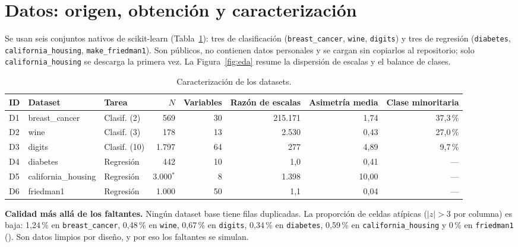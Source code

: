 \section{Datos: origen, obtención y caracterización}
\label{sec:datos}

Se usan seis conjuntos nativos de scikit-learn (Tabla~\ref{tab:datasets}): tres de clasificación (\texttt{breast\_cancer}, \texttt{wine}, \texttt{digits}) y tres de regresión (\texttt{diabetes}, \texttt{california\_housing}, \texttt{make\_friedman1}). Son públicos, no contienen datos personales y se cargan sin copiarlos al repositorio; solo \texttt{california\_housing} se descarga la primera vez. La Figura~\ref{fig:eda} resume la dispersión de escalas y el balance de clases.

\begin{table}[!htbp]
\centering
\caption{Caracterización de los datasets.}
\label{tab:datasets}
\begingroup\footnotesize\singlespacing
\begin{tabular}{@{}l l l r r r r r@{}}
\toprule
ID & Dataset & Tarea & $N$ & Variables & Razón de escalas & Asimetría media & Clase minoritaria \\
\midrule
D1 & breast\_cancer & Clasif. (2) & 569 & 30 & 215.171 & 1,74 & 37,3\,\% \\
D2 & wine & Clasif. (3) & 178 & 13 & 2.530 & 0,43 & 27,0\,\% \\
D3 & digits & Clasif. (10) & 1.797 & 64 & 277 & 4,89 & 9,7\,\% \\
D4 & diabetes & Regresión & 442 & 10 & 1,0 & 0,41 & --- \\
D5 & california\_housing & Regresión & 3.000$^{*}$ & 8 & 1.398 & 10,00 & --- \\
D6 & friedman1 & Regresión & 1.000 & 50 & 1,1 & 0,04 & --- \\
\bottomrule
\end{tabular}
\endgroup
\end{table}

\textbf{Calidad más allá de los faltantes.} Ningún dataset base tiene filas duplicadas. La proporción de celdas atípicas ($|z|>3$ por columna) es baja: 1,24\,\% en \texttt{breast\_cancer}, 0,48\,\% en \texttt{wine}, 0,67\,\% en \texttt{digits}, 0,34\,\% en \texttt{diabetes}, 0,59\,\% en \texttt{california\_housing} y 0\,\% en \texttt{friedman1} (). Son datos limpios por diseño, y por eso los faltantes se simulan.

